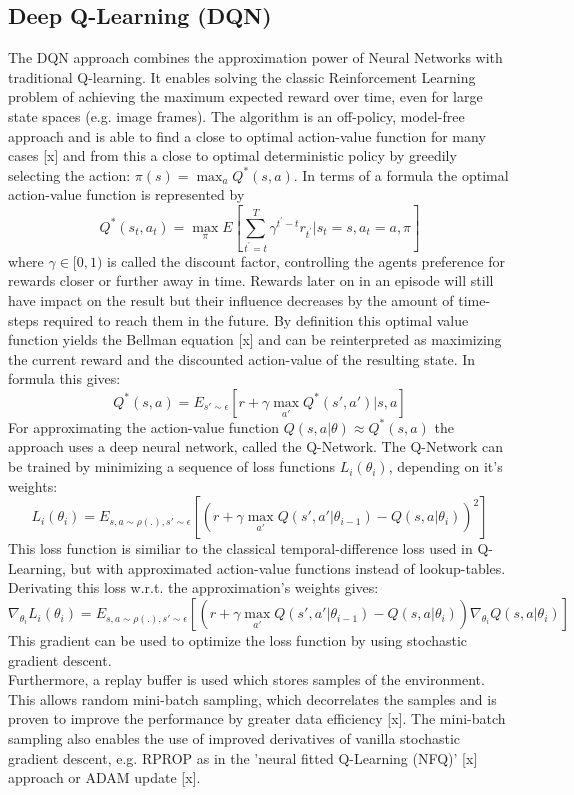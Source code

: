 \subsection{Deep Q-Learning (DQN) }
\nocite{mnih2015human}
\nocite{mnih2013playing}
\label{sec:DQN}
The DQN approach combines the approximation power of Neural Networks with traditional Q-learning.
It enables solving the classic Reinforcement Learning problem of achieving the maximum expected reward over time, even for large state spaces (e.g. image frames). The algorithm is an off-policy, model-free approach and is able to find a close to optimal action-value function for many cases [x] and from this a close to optimal deterministic policy by greedily selecting the action: $\pi(s)=\max_{a}Q^*(s,a)$. In terms of a formula the optimal action-value function is represented by
\[ 
Q^*(s_t,a_t)=\max_\pi E \left[
\sum_{t^{'}=t}^{T}\gamma^{t^{'}-t}r_{t^{'}}|s_t=s,
a_t=a, \pi \right] 
\]
 where $\gamma\in[0,1)$ is called the discount factor, controlling the agents preference for rewards closer or further away in time. Rewards later on in an episode will still have impact on the result but their influence decreases by the amount of time-steps required to reach them in the future.
By definition this optimal value function yields the Bellman equation [x] and can be reinterpreted as maximizing the current reward and the discounted action-value of the resulting state. In formula this gives:
\[
Q^*(s,a) = E_{s'\sim\epsilon}\left[
r + \gamma \max_{a'}Q^*(s',a')|s,a \right]
\]
For approximating the action-value function $Q(s,a|\theta)\approx Q^*(s,a)$ the approach uses a deep neural network, called the Q-Network.
The Q-Network can be trained by minimizing a sequence of loss functions $L_i(\theta_i)$, depending on it's weights:
\[
L_i(\theta_i)=E_{s,a\sim\rho(.),s'\sim\epsilon}
\left[\left(r+\gamma \max_{a'} Q(s', 
a'|\theta_{i-1})-Q(s,a|\theta_i)\right)^2\right] 
\]
This loss function is similiar to the classical temporal-difference loss used in Q-Learning, but with approximated action-value functions instead of lookup-tables. Derivating this loss w.r.t. the approximation's weights gives:
\[
\nabla_{\theta_i}L_i(\theta_i)=E_{s,a\sim\rho(.),s'\sim\epsilon}
\left[\left(r+\gamma \max_{a'} Q(s', 
a'|\theta_{i-1})-Q(s,a|\theta_i)\right)\nabla_{\theta_i}Q(s,a|\theta_i)\right] 
\]
This gradient can be used to optimize the loss function by using stochastic gradient descent.\\
Furthermore, a replay buffer is used which stores samples of the environment. This allows random mini-batch sampling, which decorrelates the samples and is proven to improve the performance by greater data efficiency [x]. The mini-batch sampling also enables the use of improved derivatives of vanilla stochastic gradient descent, e.g. RPROP as in the 'neural fitted Q-Learning (NFQ)' [x] approach or ADAM update [x].\\
